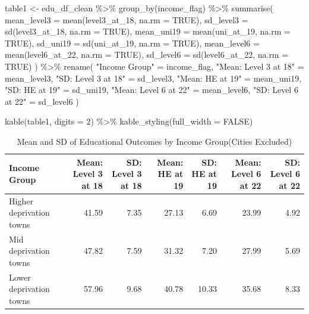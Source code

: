 \documentclass[11pt,en]{../tex/elegantpaper}
\newenvironment{Shaded}{\begin{snugshade}}{\end{snugshade}}
\newcommand{\AttributeTok}[1]{\textcolor[rgb]{0.77,0.63,0.00}{#1}}
\newcommand{\ConstantTok}[1]{\textcolor[rgb]{0.00,0.00,0.00}{#1}}
\newcommand{\DecValTok}[1]{\textcolor[rgb]{0.00,0.00,0.81}{#1}}
\newcommand{\FunctionTok}[1]{\textcolor[rgb]{0.00,0.00,0.81}{#1}}
\newcommand{\NormalTok}[1]{#1}
\newcommand{\OtherTok}[1]{\textcolor[rgb]{0.50,0.00,0.50}{#1}}
\newcommand{\SpecialCharTok}[1]{\textcolor[rgb]{0.00,0.00,0.00}{#1}}
\newcommand{\StringTok}[1]{\textcolor[rgb]{0.31,0.60,0.02}{#1}}
\begin{document}
\begin{Shaded}
\begin{Highlighting}[]
\NormalTok{table1 }\OtherTok{\textless{}{-}}\NormalTok{ edu\_df\_clean }\SpecialCharTok{\%\textgreater{}\%}
  \FunctionTok{group\_by}\NormalTok{(income\_flag) }\SpecialCharTok{\%\textgreater{}\%}
  \FunctionTok{summarise}\NormalTok{(}
    \AttributeTok{mean\_level3 =} \FunctionTok{mean}\NormalTok{(level3\_at\_18, }\AttributeTok{na.rm =} \ConstantTok{TRUE}\NormalTok{),}
    \AttributeTok{sd\_level3 =} \FunctionTok{sd}\NormalTok{(level3\_at\_18, }\AttributeTok{na.rm =} \ConstantTok{TRUE}\NormalTok{),}
    \AttributeTok{mean\_uni19 =} \FunctionTok{mean}\NormalTok{(uni\_at\_19, }\AttributeTok{na.rm =} \ConstantTok{TRUE}\NormalTok{),}
    \AttributeTok{sd\_uni19 =} \FunctionTok{sd}\NormalTok{(uni\_at\_19, }\AttributeTok{na.rm =} \ConstantTok{TRUE}\NormalTok{),}
    \AttributeTok{mean\_level6 =} \FunctionTok{mean}\NormalTok{(level6\_at\_22, }\AttributeTok{na.rm =} \ConstantTok{TRUE}\NormalTok{),}
    \AttributeTok{sd\_level6 =} \FunctionTok{sd}\NormalTok{(level6\_at\_22, }\AttributeTok{na.rm =} \ConstantTok{TRUE}\NormalTok{)}
\NormalTok{  ) }\SpecialCharTok{\%\textgreater{}\%}
  \FunctionTok{rename}\NormalTok{(}
    \StringTok{"Income Group"} \OtherTok{=}\NormalTok{ income\_flag,}
    \StringTok{"Mean: Level 3 at 18"} \OtherTok{=}\NormalTok{ mean\_level3,}
    \StringTok{"SD: Level 3 at 18"} \OtherTok{=}\NormalTok{ sd\_level3,}
    \StringTok{"Mean: HE at 19"} \OtherTok{=}\NormalTok{ mean\_uni19,}
    \StringTok{"SD: HE at 19"} \OtherTok{=}\NormalTok{ sd\_uni19,}
    \StringTok{"Mean: Level 6 at 22"} \OtherTok{=}\NormalTok{ mean\_level6,}
    \StringTok{"SD: Level 6 at 22"} \OtherTok{=}\NormalTok{ sd\_level6}
\NormalTok{  )}

\FunctionTok{kable}\NormalTok{(table1, }\AttributeTok{digits =} \DecValTok{2}\NormalTok{) }\SpecialCharTok{\%\textgreater{}\%}
  \FunctionTok{kable\_styling}\NormalTok{(}\AttributeTok{full\_width =} \ConstantTok{FALSE}\NormalTok{)}
\end{Highlighting}
\end{Shaded}

\begin{longtable}[t]{lrrrrrr}

\caption{\label{tbl-edu_means_by_income}Mean and SD of Educational
Outcomes by Income Group(Cities Excluded)}

\tabularnewline

\toprule
Income Group & Mean: Level 3 at 18 & SD: Level 3 at 18 & Mean: HE at 19 & SD: HE at 19 & Mean: Level 6 at 22 & SD: Level 6 at 22\\
\midrule
Higher deprivation towns & 41.59 & 7.35 & 27.13 & 6.69 & 23.99 & 4.92\\
Mid deprivation towns & 47.82 & 7.59 & 31.32 & 7.20 & 27.99 & 5.69\\
Lower deprivation towns & 57.96 & 9.68 & 40.78 & 10.33 & 35.68 & 8.33\\
\bottomrule

\end{longtable}
\end{document}

